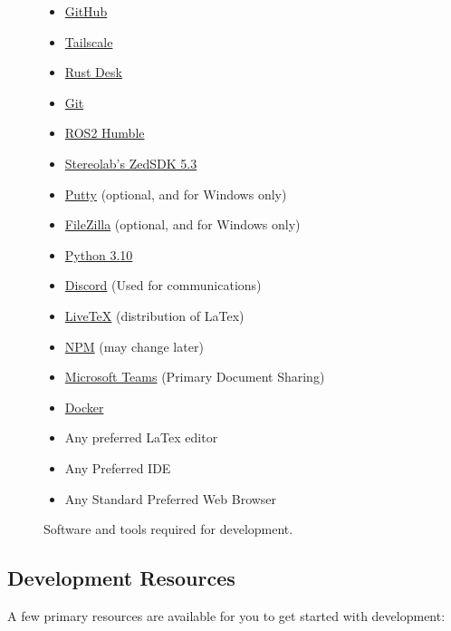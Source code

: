 \begin{figure}[H]
    \centering
    \begin{minipage}{0.9\textwidth}
        \begin{itemize}
            \item \href{https://github.com}{GitHub}
            \item \href{https://tailscale.com/download}{Tailscale}
            \item \href{https://rustdesk.com}{Rust Desk}
            \item \href{https://git-scm.com/install/}{Git}
            \item \href{https://docs.ros.org/en/humble/Installation.html}{ROS2 Humble}
            \item \href{https://www.stereolabs.com/en-ca/developers/release/}{Stereolab's ZedSDK 5.3}
            \item \href{https://putty.org/index.html}{Putty} (optional, and for Windows only)
            \item \href{https://filezilla-project.org/download.php}{FileZilla} (optional, and for Windows only)
            \item \href{https://www.python.org/downloads/release/python-3100/}{Python 3.10}
            \item \href{https://discord.com/download}{Discord} (Used for communications)
            \item \href{https://tug.org/texlive/}{LiveTeX} (distribution of LaTex)
            \item \href{https://nodejs.org/en/download}{NPM} (may change later)
            \item \href{https://windowsreport.com/how-to-install-microsoft-teams/}{Microsoft Teams} (Primary Document Sharing)
            \item \href{https://docs.docker.com/engine/install/}{Docker}
            \item Any preferred LaTex editor
            \item Any Preferred IDE
            \item Any Standard Preferred Web Browser
        \end{itemize}
    \end{minipage}
    \caption{Software and tools required for development.}
    \label{fig:dev-software}
\end{figure}

\subsection{Development Resources}
A few primary resources are available for you to get started with development:

